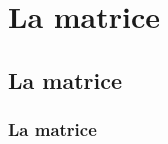 \documentclass{article}
\makeatletter
\newcommand{\pmatrixcmd}[1]{}%
\DeclareRobustCommand{\pmatrixcmd}[1]{%
		\left(\env@matrix#1\endmatrix\right)
		}
\makeatother
\begin{document}
\tableofcontents

\section{La matrice $\pmatrixcmd{1 & 2 \\ 3 & 4}$}

\subsection{La matrice $\pmatrixcmd{1 & 2 \\ 3 & 4}$}

\subsubsection{La matrice $\pmatrixcmd{1 & 2 \\ 3 & 4}$}
\end{document}
